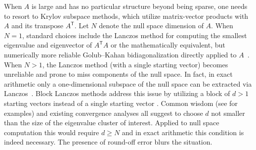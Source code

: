 \documentclass{siamart190516}
\newcommand{\Ttran}{\mathsf{T}}
\newcommand{\T}{\mathsf{T}}
\begin{document}
When $A$ is large and has no particular structure beyond being sparse, one needs to resort to Krylov subspace methods, which utilize matrix-vector products with $A$ and its transpose $A^\T$. Let $N$ denote the null space dimension of $A$. When $N = 1$, standard choices include the Lanczos method for computing the smallest eigenvalue and eigenvector of $A^{\Ttran}A$ or the mathematically equivalent, but numerically more reliable
Golub--Kahan bidiagonalization directly applied to $A$~\cite[Chapter~10]{Golub2013}. When $N>1$, the Lanczos method (with a single starting vector) becomes unreliable and prone to miss components of the null space. In fact, in exact arithmetic only a one-dimensional subspace of the null space can be extracted via Lanczos~\cite[Section~12.2]{Parlett1998}. Block Lanczos methods address this issue by utilizing a block of $d>1$ starting vectors instead of a single starting vector \cite[Section~13.10]{Parlett1998}. 
Common wisdom (see \cite[Section~13.12]{Parlett1998} for examples) and existing convergence analyses all suggest to choose $d$ not smaller than the size of the eigenvalue cluster of interest. Applied to null space computation this would require $d \ge N$ and in exact arithmetic this condition is indeed necessary. The presence of round-off error blurs the situation.
\end{document}
